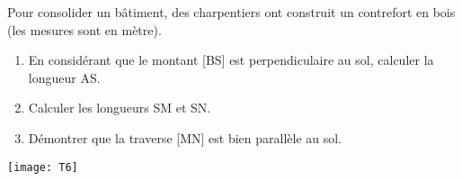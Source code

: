 \begin{exercice}
Pour consolider un bâtiment, des charpentiers  ont construit un contrefort en bois (les mesures sont en mètre).

\begin{minipage}{0.5\linewidth}
\begin{enumerate}
\item En considérant que le montant [BS] est perpendiculaire au sol, calculer la longueur AS.
\item Calculer les longueurs SM et SN.
\item Démontrer que la traverse [MN] est bien parallèle au sol.
\end{enumerate}

\end{minipage}
\hfill
\begin{minipage}{0.4\linewidth}
\begin{center}
\texttt{[image: T6]}
\end{center}
\end{minipage}
\end{exercice} 










